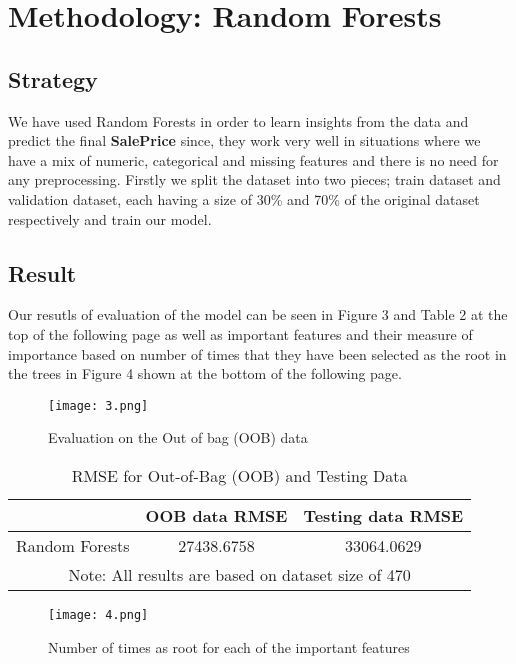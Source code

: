 \documentclass[a4paper,12pt]{article}
\begin{document}
\section{Methodology: Random Forests}
\subsection{Strategy}
We have used Random Forests in order to learn insights from the data and predict the final \textbf{SalePrice} since, they work very well in situations where we have a mix of numeric, categorical and missing features and there is no need for any preprocessing.
Firstly we split the dataset into two pieces; train dataset and validation dataset, each having a size of 30\% and 70\% of the original dataset respectively and train our model.

\subsection{Result}
Our resutls of evaluation of the model can be seen in Figure 3 and Table 2 at the top of the following page as well as important features and their measure of importance based on number of times that they have been selected as the root in the trees in Figure 4 shown at the bottom of the following page.

\begin{figure}[] %
    \centering
    \texttt{[image: 3.png]} %
    \caption{Evaluation on the Out of bag (OOB) data}
\end{figure}

\begin{table}[htbp]
    \centering
    \caption{RMSE for Out-of-Bag (OOB) and Testing Data}
    \label{tab:classifiers}
    \begin{tabular}{lcc}
    \toprule
    & \textbf{OOB data RMSE} & \textbf{Testing data RMSE} \\
    \midrule
    Random Forests & 27438.6758 & 33064.0629 \\
    \bottomrule
    \multicolumn{3}{c}{\footnotesize Note: All results are based on dataset size of 470} \\
    \end{tabular}
\end{table}

\begin{figure}[] %
    \centering
    \texttt{[image: 4.png]} %
    \caption{Number of times as root for each of the important features}
\end{figure}
\end{document}
